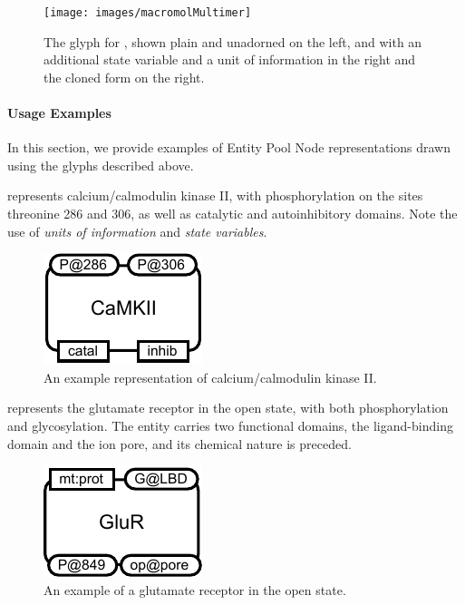 \begin{figure}[htb]
  \centering
  \texttt{[image: images/macromolMultimer]}
  \caption{The \PD glyph for , shown plain and
    unadorned on the left, and with an additional state variable and a
    unit of information in the right and the cloned form on the right.}
  \label{fig:techref:macromolMultimer}
\end{figure}

\paragraph{Usage Examples}
\label{sec:techref:CplxEPNs}

In this section, we provide examples of Entity Pool Node representations drawn using the \SBGNPDLone glyphs described above.

 represents calcium/calmodulin kinase II, with phosphorylation on the sites threonine 286 and 306, as well as catalytic and autoinhibitory domains.  Note the use of \emph{units of information} and \emph{state variables}.

\begin{figure}[htb]
  \centering
  \includegraphics[scale = 0.3]{examples/macromolecule-CaMKII}
  \caption{An example representation of calcium/calmodulin kinase II.}
  \label{fig:techref:example-camkii}
\end{figure}

 represents the glutamate receptor in the open state, with both phosphorylation and glycosylation. The entity carries two functional domains, the ligand-binding domain and the ion pore, and its chemical nature is preceded.

\begin{figure}[htb]
  \centering
  \includegraphics[scale = 0.3]{examples/macromolecule-GluR}
  \caption{An example of a glutamate receptor in the open state.}
  \label{fig:techref:example-glur}
\end{figure}


